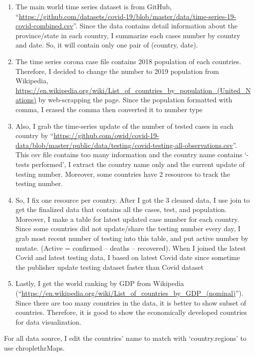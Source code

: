 \documentclass[
  11pt,
]{article}
\begin{document}
\begin{enumerate}
\def\labelenumi{\arabic{enumi}.}
\item
  The main world time series dataset is from GitHub,
  ``\url{https://github.com/datasets/covid-19/blob/master/data/time-series-19-covid-combined.csv}''.
  Since the data contains detail information about the province/state in
  each country, I summarize each cases number by country and date. So,
  it will contain only one pair of (country, date).
\item
  The time series corona case file contains 2018 population of each
  countries. Therefore, I decided to change the number to 2019
  population from Wikipedia,
  \url{https://en.wikipedia.org/wiki/List_of_countries_by_population_(United_Nations)}
  by web-scrapping the page. Since the population formatted with comma,
  I erased the comma then converted it to number type
\item
  Also, I grab the time-series update of the number of tested cases in
  each country by
  ``\url{https://github.com/owid/covid-19-data/blob/master/public/data/testing/covid-testing-all-observations.csv}''.
  This csv file contains too many information and the country name
  contains `- tests performed', I extract the country name only and the
  current update of testing number. Moreover, some countries have 2
  resources to track the testing number.
\item
  So, I fix one resource per country. After I got the 3 cleaned data, I
  use join to get the finalized data that contains all the cases, test,
  and population. Moreover, I make a table for latest updated case
  number for each country. Since some countries did not update/share the
  testing number every day, I grab most recent number of testing into
  this table, and put active number by mutate. (Active = confirmed --
  deaths -- recovered). When I joined the latest Covid and latest
  testing data, I based on latest Covid date since sometime the
  publisher update testing dataset faster than Covid dataset
\item
  Lastly, I get the world ranking by GDP from Wikipedia
  (``\url{https://en.wikipedia.org/wiki/List_of_countries_by_GDP_(nominal)}'').
  Since there are too many countries in the data, it is better to show
  subset of countries. Therefore, it is good to show the economically
  developed countries for data visualization.
\end{enumerate}

For all data source, I edit the countries' name to match with
`country.regions' to use chroplethrMaps.
\end{document}

